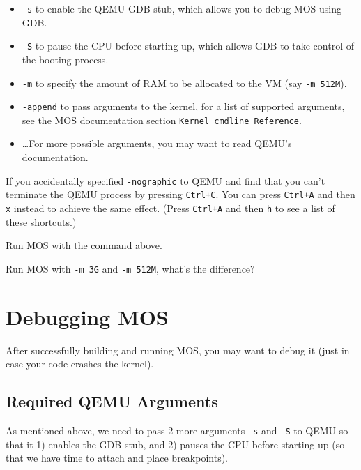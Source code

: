 \begin{itemize}
    \item \texttt{-s} to enable the QEMU GDB stub, which allows you to debug MOS using GDB.
    \item \texttt{-S} to pause the CPU before starting up, which allows GDB to take control of
          the booting process.
    \item \texttt{-m} to specify the amount of RAM to be allocated to the VM (say \texttt{-m 512M}).
    \item \texttt{-append} to pass arguments to the kernel, for a list of supported arguments,
          see the MOS documentation section \texttt{Kernel cmdline Reference}.
    \item \dots For more possible arguments, you may want to read QEMU's documentation.
\end{itemize}

\begin{tip}
    \item If you accidentally specified \texttt{-nographic} to QEMU and find that you can't terminate
    the QEMU process by pressing \texttt{Ctrl+C}. You can press \texttt{Ctrl+A} and then \texttt{x}
    instead to achieve the same effect. (Press \texttt{Ctrl+A} and then \texttt{h} to see a list of these
    shortcuts.)
\end{tip}

\begin{exercise}
    \item Run MOS with the command above.
    \item Run MOS with \texttt{-m 3G} and \texttt{-m 512M}, what's the difference?
\end{exercise}

\section{Debugging MOS}

After successfully building and running MOS, you may want to debug it (just in case your code crashes
the kernel).

\subsection{Required QEMU Arguments} \label{sec:qemu-args}

As mentioned above, we need to pass 2 more arguments \texttt{-s} and \texttt{-S} to QEMU so that it
1) enables the GDB stub, and 2) pauses the CPU before starting up (so that we have time to attach and
place breakpoints).


